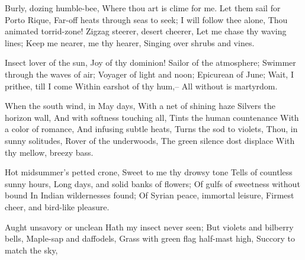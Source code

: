 

\begin{poem}
	\begin{stanza}
			Burly, dozing humble-bee,\verseline
			Where thou art is clime for me.\verseline
			Let them sail for Porto Rique,\verseline
			Far-off heats through seas to seek;\verseline
			I will follow thee alone,\verseline
			Thou animated torrid-zone!\verseline
			Zigzag steerer, desert cheerer,\verseline
			Let me chase thy waving lines;\verseline
			Keep me nearer, me thy hearer,\verseline
			Singing over shrubs and vines.
	\end{stanza}
	\begin{stanza}
			Insect lover of the sun,\verseline
			Joy of thy dominion!\verseline
			Sailor of the atmosphere;\verseline
			Swimmer through the waves of air;\verseline
			Voyager of light and noon;\verseline
			Epicurean of June;\verseline
			Wait, I prithee, till I come\verseline
			Within earshot of thy hum,--\verseline
			All without is martyrdom.
	\end{stanza}
	\begin{stanza}
			When the south wind, in May days,\verseline
			With a net of shining haze\verseline
			Silvers the horizon wall,\verseline
			And with softness touching all,\verseline
			Tints the human countenance\verseline
			With a color of romance,\verseline
			And infusing subtle heats,\verseline
			Turns the sod to violets,\verseline
			Thou, in sunny solitudes,\verseline
			Rover of the underwoods,\verseline
			The green silence dost displace\verseline
			With thy mellow, breezy bass.
	\end{stanza}
	\begin{stanza}
			Hot midsummer's petted crone,\verseline
			Sweet to me thy drowsy tone\verseline
			Tells of countless sunny hours,\verseline
			Long days, and solid banks of flowers;\verseline
			Of gulfs of sweetness without bound\verseline
			In Indian wildernesses found;\verseline
			Of Syrian peace, immortal leisure,\verseline
			Firmest cheer, and bird-like pleasure.
	\end{stanza}
	\begin{stanza}
			Aught unsavory or unclean\verseline
			Hath my insect never seen;\verseline
			But violets and bilberry bells,\verseline
			Maple-sap and daffodels,\verseline
			Grass with green flag half-mast high,\verseline
			Succory to match the sky,\verseline

\end{stanza}
\end{poem}
